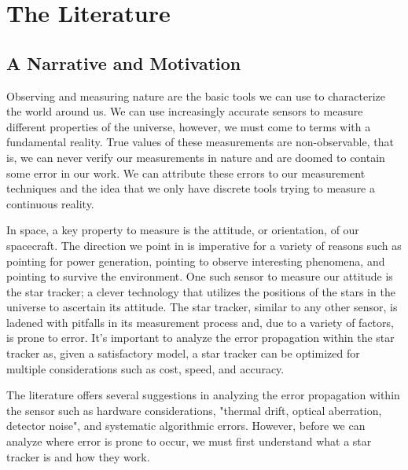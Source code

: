\chapter{The Literature}

\section{A Narrative and Motivation}
\par \qquad Observing and measuring nature are the basic tools we can use to characterize the world around us.
We can use increasingly accurate sensors to measure different properties of the universe, however, we must come to terms with a fundamental reality.
True values of these measurements are non-observable, that is, we can never verify our measurements in nature and are doomed to contain some error in our work.
We can attribute these errors to our measurement techniques and the idea that we only have discrete tools trying to measure a continuous reality.

\par \qquad In space, a key property to measure is the attitude, or orientation, of our spacecraft.
The direction we point in is imperative for a variety of reasons such as pointing for power generation, pointing to observe interesting phenomena, and pointing to survive the environment.
One such sensor to measure our attitude is the star tracker; a clever technology that utilizes the positions of the stars in the universe to ascertain its attitude.
The star tracker, similar to any other sensor, is ladened with pitfalls in its measurement process and, due to a variety of factors, is prone to error.
It's important to analyze the error propagation within the star tracker as, given a satisfactory model, a star tracker can be optimized for multiple considerations such as cost, speed, and accuracy.

\par \qquad The literature offers several suggestions in analyzing the error propagation within the sensor such as hardware considerations, "thermal drift, optical aberration, detector noise"\cite{systematic_error_analysis_of_star_tracker_centroiding}, and systematic algorithmic errors. However, before we can analyze where error is prone to occur, we must first understand what a star tracker is and how they work.

